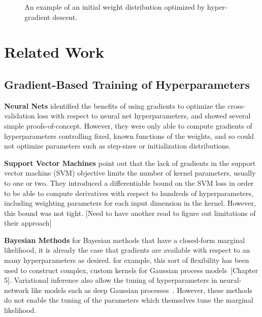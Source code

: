\documentclass{article}
\begin{document}
\begin{figure}[ht]
\vskip 0.2in
\begin{center}
\caption{An example of an initial weight distribution optimized by hyper-gradient descent.}
\label{fig:optimal schedule}
\end{center}
\vskip -0.2in
\end{figure} 


\section{Related Work}

\subsection{Gradient-Based Training of Hyperparameters}
\textbf{Neural Nets}
\citet{bengio2000gradient, larsen1998adaptive} identified the benefits of using gradients to optimize the cross-validation loss with respect to neural net hyperparameters, and showed several simple proofs-of-concept.
However, they were only able to compute gradients of hyperparameters controlling fixed, known functions of the weights, and so could not optimize parameters such as step-sizes or initialization distributions.

\textbf{Support Vector Machines}
\citet{chapelle2002choosing} point out that the lack of gradients in the support vector machine (SVM) objective limits the number of kernel parameters, usually to one or two.
They introduced a differentiable bound on the SVM loss in order to be able to compute derivatives with respect to hundreds of hyperparameters, including weighting parameters for each input dimension in the kernel.
However, this bound was not tight. [Need to have another read to figure out limitations of their approach]

\textbf{Bayesian Methods}
for Bayesian methods that have a closed-form marginal likelihood, it is already the case that gradients are available with respect to an many hyperparameters as desired.
for example, this sort of flexibility has been used to construct complex, custom kernels for Gaussian process models~\cite{rasmussen38gaussian}[Chapter 5].
Variational inference also allow the tuning of hyperparameters in neural-network like models such as deep Gaussian processes~\citep{deepGPVar14}.
However, these methods do not enable the tuning of the parameters which themselves tune the marginal likelihood.
\end{document}
